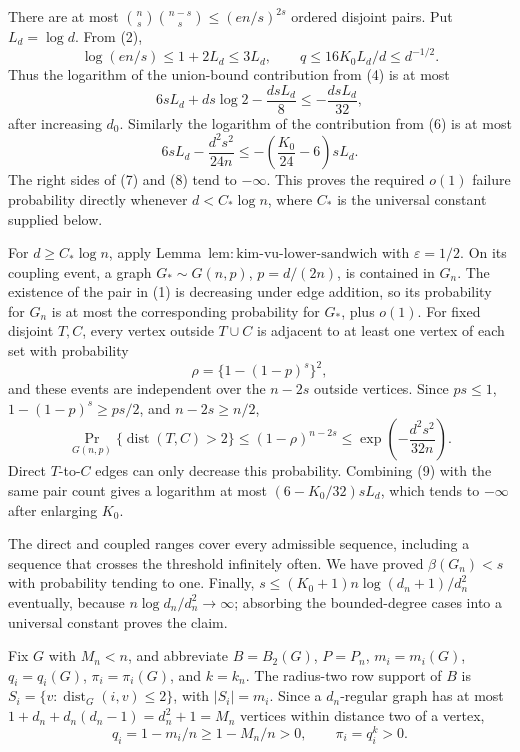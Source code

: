 There are at most \(\binom ns\binom{n-s}s\le(en/s)^{2s}\) ordered disjoint pairs.  Put \(L_d=\log d\).  From (2),
\[
\log(en/s)\le1+2L_d\le3L_d,
\qquad
q\le16K_0L_d/d\le d^{-1/2}.
\]
Thus the logarithm of the union-bound contribution from (4) is at most
\[
6sL_d+ds\log2-\frac{dsL_d}{8}
\le-\frac{dsL_d}{32},
\tag{7}
\]
after increasing \(d_0\).  Similarly the logarithm of the contribution from (6) is at most
\[
6sL_d-\frac{d^2s^2}{24n}
\le-\left(\frac{K_0}{24}-6\right)sL_d.
\tag{8}
\]
The right sides of (7) and (8) tend to \(-\infty\).  This proves the required \(o(1)\) failure probability directly whenever \(d<C_*\log n\), where \(C_*\) is the universal constant supplied below.

For \(d\ge C_*\log n\), apply Lemma~\(\mathrm{lem{:}kim\mbox{-}vu\mbox{-}lower\mbox{-}sandwich}\) with \(\varepsilon=1/2\).  On its coupling event, a graph \(G_*\sim G(n,p)\), \(p=d/(2n)\), is contained in \(G_n\).  The existence of the pair in (1) is decreasing under edge addition, so its probability for \(G_n\) is at most the corresponding probability for \(G_*\), plus \(o(1)\).  For fixed disjoint \(T,C\), every vertex outside \(T\cup C\) is adjacent to at least one vertex of each set with probability
\[
\rho=\{1-(1-p)^s\}^2,
\]
and these events are independent over the \(n-2s\) outside vertices.  Since \(ps\le1\), \(1-(1-p)^s\ge ps/2\), and \(n-2s\ge n/2\),
\[
\Pr_{G(n,p)}\{\operatorname{dist}(T,C)>2\}
\le(1-\rho)^{n-2s}
\le\exp\!\left(-\frac{d^2s^2}{32n}\right).
\tag{9}
\]
Direct \(T\)-to-\(C\) edges can only decrease this probability.  Combining (9) with the same pair count gives a logarithm at most \((6-K_0/32)sL_d\), which tends to \(-\infty\) after enlarging \(K_0\).

The direct and coupled ranges cover every admissible sequence, including a sequence that crosses the threshold infinitely often.  We have proved \(\beta(G_n)<s\) with probability tending to one.  Finally, \(s\le (K_0+1)n\log(d_n+1)/d_n^2\) eventually, because \(n\log d_n/d_n^2\to\infty\); absorbing the bounded-degree cases into a universal constant proves the claim.

Fix \(G\) with \(M_n<n\), and abbreviate \(B=B_2(G)\), \(P=P_n\), \(m_i=m_i(G)\), \(q_i=q_i(G)\), \(\pi_i=\pi_i(G)\), and \(k=k_n\).  The radius-two row support of \(B\) is \(S_i=\{v:\operatorname{dist}_G(i,v)\le2\}\), with \(|S_i|=m_i\).  Since a \(d_n\)-regular graph has at most \(1+d_n+d_n(d_n-1)=d_n^2+1=M_n\) vertices within distance two of a vertex,
\[
q_i=1-m_i/n\ge1-M_n/n>0,
\qquad
\pi_i=q_i^k>0.
\tag{10}
\]

